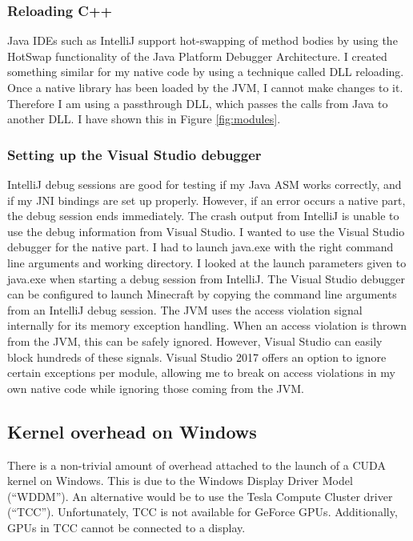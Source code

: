 \documentclass[]{article}
\begin{document}
\subsubsection{Reloading C++}
Java IDEs such as IntelliJ support hot-swapping of method bodies by using the HotSwap functionality of the Java Platform Debugger Architecture.
I created something similar for my native code by using a technique called DLL reloading.
Once a native library has been loaded by the JVM, I cannot make changes to it.
Therefore I am using a passthrough DLL, which passes the calls from Java to another DLL.
I have shown this in Figure \ref{fig:modules}.

\subsubsection{Setting up the Visual Studio debugger}
IntelliJ debug sessions are good for testing if my Java ASM works correctly, and if my JNI bindings are set up properly.
However, if an error occurs a native part, the debug session ends immediately.
The crash output from IntelliJ is unable to use the debug information from Visual Studio.
I wanted to use the Visual Studio debugger for the native part.
I had to launch java.exe with the right command line arguments and working directory.
I looked at the launch parameters given to java.exe when starting a debug session from IntelliJ.
The Visual Studio debugger can be configured to launch Minecraft by copying the command line arguments from an IntelliJ debug session.
The JVM uses the access violation signal internally for its memory exception handling.
When an access violation is thrown from the JVM, this can be safely ignored.
However, Visual Studio can easily block hundreds of these signals.
Visual Studio 2017 offers an option to ignore certain exceptions per module, allowing me to break on access violations in my own native code while ignoring those coming from the JVM.

\subsection{Kernel overhead on Windows}
There is a non-trivial amount of overhead attached to the launch of a CUDA kernel on Windows.
This is due to the Windows Display Driver Model (\enquote{WDDM}).
An alternative would be to use the Tesla Compute Cluster driver (\enquote{TCC}).
Unfortunately, TCC is not available for GeForce GPUs.
Additionally, GPUs in TCC cannot be connected to a display.
\end{document}
